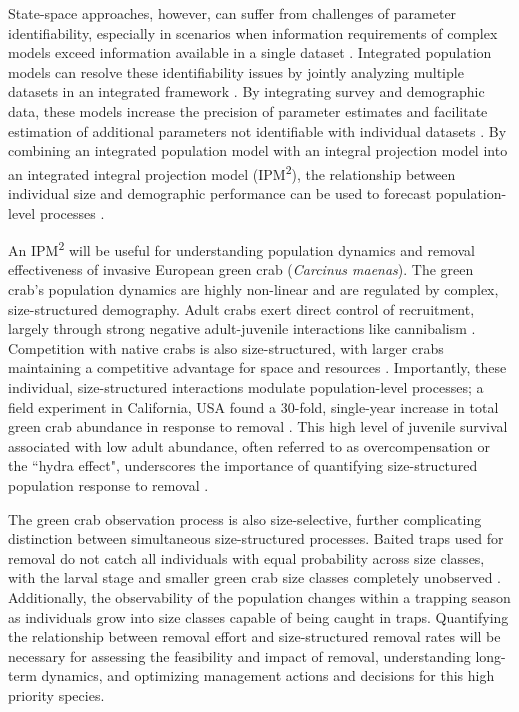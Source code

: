 \documentclass{article}
\begin{document}
State-space approaches, however, can suffer from challenges of parameter identifiability, especially in scenarios when information requirements of complex models exceed information available in a single dataset \parencite{auger2016state, knape2008estimability}. Integrated population models can resolve these identifiability issues by jointly analyzing multiple datasets in an integrated framework \parencite{besbeas2002integrating}. By integrating survey and demographic data, these models increase the precision of parameter estimates and facilitate estimation of additional parameters not identifiable with individual datasets \parencite{riecke2019integrated, abadi2010assessment}. By combining an integrated population model with an integral projection model into an integrated integral projection model (IPM\textsuperscript{2}), the relationship between individual size and demographic performance can be used to forecast population-level processes \parencite{plard2019ipm}.

An IPM\textsuperscript{2} will be useful for understanding population dynamics and removal effectiveness of invasive European green crab (\textit{Carcinus maenas}). The green crab’s population dynamics are highly non-linear and are regulated by complex, size-structured demography. Adult crabs exert direct control of recruitment, largely through strong negative adult-juvenile interactions like cannibalism
\parencite{grosholz2021stage, romano2017cannibalism}. Competition with native crabs is also size-structured, with larger crabs maintaining a competitive advantage for space and resources \parencite{mcdonald2001competitive, jensen2007biotic}. Importantly, these individual, size-structured interactions modulate population-level processes; a field experiment in California, USA found a 30-fold, single-year increase in total green crab abundance in response to removal \parencite{grosholz2021stage}. This high level of juvenile survival associated with low adult abundance, often referred to as overcompensation or the ``hydra effect", underscores the importance of quantifying size-structured population response to removal \parencite{abrams2009does}. 

The green crab observation process is also size-selective, further complicating distinction between simultaneous size-structured processes. Baited traps used for removal do not catch all individuals with equal probability across size classes, with the larval stage and smaller green crab size classes completely unobserved \parencite{jorgensen2009size}. Additionally, the observability of the population changes within a trapping season as individuals grow into size classes capable of being caught in traps. Quantifying the relationship between removal effort and size-structured removal rates will be necessary for assessing the feasibility and impact of removal, understanding long-term dynamics, and optimizing management actions and decisions for this high priority species. 
\end{document}

